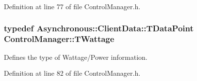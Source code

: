 Definition at line 77 of file Control\-Manager.\-h.

\hypertarget{class_control_manager_a24609feed8b0443df450b070194df20a}{
\subsubsection[{T\-Wattage}]{\setlength{\rightskip}{0pt plus 5cm}typedef {\bf Asynchronous\-::\-Client\-Data\-::\-T\-Data\-Point} {\bf Control\-Manager\-::\-T\-Wattage}}}\label{class_control_manager_a24609feed8b0443df450b070194df20a}
Defines the type of Wattage/\-Power information. 

Definition at line 82 of file Control\-Manager.\-h.



